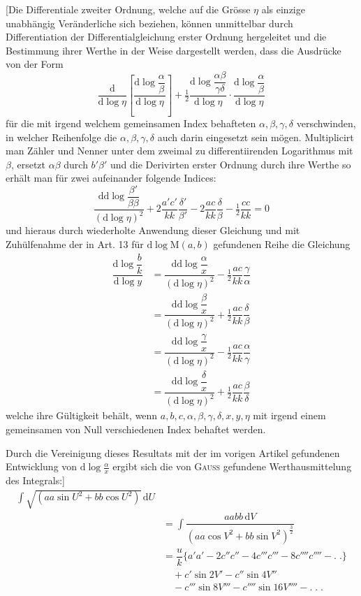 [Die Differentiale zweiter Ordnung, welche auf die Grösse $\eta$ als einzige unabhängig Veränderliche sich beziehen,
können unmittelbar durch Differentiation der Differentialgleichung erster Ordnung hergeleitet
und die Bestimmung ihrer Werthe in der Weise dargestellt werden, dass die Ausdrücke von der Form
\[
\dfrac{\mathrm{d}}{\mathrm{d}\log\eta}
\left[\dfrac{\mathrm{d}\log\dfrac{\alpha}{\beta}}{\mathrm{d}\log\eta}\right]
+\tfrac12\dfrac{\mathrm{d}\log\dfrac{\alpha\beta}{\gamma\delta}}{\mathrm{d}\log\eta}
\cdot\dfrac{\mathrm{d}\log\dfrac{\alpha}{\beta}}{\mathrm{d}\log\eta}
\]
für die mit irgend welchem gemeinsamen Index behafteten $\alpha,\allowbreak \beta,\allowbreak \gamma,\allowbreak \delta$ verschwinden,
in welcher Reihenfolge die $\alpha,\allowbreak \beta,\allowbreak \gamma,\allowbreak \delta$ auch darin eingesetzt sein mögen.
Multiplicirt man Zähler und Nenner unter dem zweimal zu differentiirenden Logarithmus mit $\beta$,
ersetzt $\alpha\beta$ durch $b'\beta'$ und die Derivirten erster Ordnung durch ihre Werthe
so erhält man für zwei aufeinander folgende Indices:
\[
\dfrac{\mathrm{dd}\log\dfrac{\beta'}{\beta\beta}}{(\mathrm{d}\log\eta)^2}
+2\dfrac{a'c'}{kk}\dfrac{\delta'}{\beta'}
-2\dfrac{ac}{kk}\dfrac{\delta}{\beta}-\tfrac12\dfrac{cc}{kk}=0
\]
und hieraus durch wiederholte Anwendung dieser Gleichung und mit Zuhülfenahme
der in Art. 13 für $\mathrm{d}\log\mathrm{M}(a,\allowbreak b)$ gefundenen Reihe die Gleichung
\[
\begin{aligned}\dfrac{\mathrm{d}\log\dfrac{b}{k}}{\mathrm{d}\log y}
&=\dfrac{\mathrm{dd}\log\dfrac{\alpha}{x}}{(\mathrm{d}\log\eta)^2}-\tfrac12\dfrac{ac}{kk}\dfrac{\gamma}{\alpha}
\\[7pt]&=\dfrac{\mathrm{dd}\log\dfrac{\beta}{x}}{(\mathrm{d}\log\eta)^2}+\tfrac12\dfrac{ac}{kk}\dfrac{\delta}{\beta}
\\[7pt]&=\dfrac{\mathrm{dd}\log\dfrac{\gamma}{x}}{(\mathrm{d}\log\eta)^2}-\tfrac12\dfrac{ac}{kk}\dfrac{\alpha}{\gamma}
\\[7pt]&=\dfrac{\mathrm{dd}\log\dfrac{\delta}{x}}{(\mathrm{d}\log\eta)^2}+\tfrac12\dfrac{ac}{kk}\dfrac{\beta}{\delta}\end{aligned}
\]
welche ihre Gültigkeit behält, wenn $a,\allowbreak b,\allowbreak c,\allowbreak \alpha,\allowbreak \beta,\allowbreak \gamma,\allowbreak \delta,\allowbreak x,\allowbreak y,\allowbreak \eta$
mit irgend einem gemeinsamen von Null verschiedenen Index behaftet werden.

Durch die Vereinigung dieses Resultats mit der im vorigen Artikel gefundenen Entwicklung von
$\mathrm{d}\log\frac{\alpha}{x}$ ergibt sich die von \textsc{Gauss} gefundene Werthausmittelung des Integrals:]
\[
\begin{aligned}
\int\surd{(aa\sin U^2+bb\cos U^2)}\,\mathrm{d}U
\\[7pt]&=\int\dfrac{aabb\,\mathrm{d}V}{(aa\cos V^2+bb\sin V^2)^{\frac32}}\\
&=\dfrac{u}{k}\{a'a'-2c''c''-4c'''c'''-8c''''c''''-.\;.\}\\
&\quad+c'\sin 2V'-c''\sin 4V''\\&\quad-c'''\sin 8V'''-c''''\sin 16V''''-.\;.\;.\end{aligned}
\]

